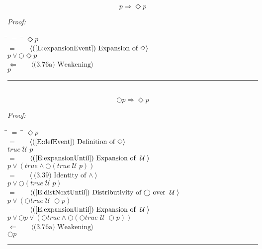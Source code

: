 \documentclass[fleqn, leqno]{article}
\newcommand{\lgap}{2pt}                             %
\newcommand{\mymathindent}{24pt}                      %
\newcommand{\Until}{\;\mathcal{U}\;}
\newcommand{\Next}{\bigcirc}
\newcommand{\Event}{\Diamond}
\newcommand{\myqed}{\hfill\rule[-.23ex]{1.2ex}{2.0ex}}
\newcommand{\Gll} {\langle}                         %
\newcommand{\Ggg} {\rangle}                         %
\newcommand{\Hint}[1]     {\ \ \ $\Gll              \mbox{#1} \Ggg$ }   %
\begin{document}
\begin{equation}\label{E:impEvent}
p \Rightarrow \Event p
\end{equation}

\emph{Proof:}
\begin{tabbing}
\hspace{\mymathindent} \= $= \;$ \= \kill
  \> \>   $\Event p$\\[\lgap]
  \> $=$  \>  \Hint{(\ref{E:expansionEvent}) Expansion of $\Event$}\\[\lgap]
  \> \>   $p \lor \Next\Event p$\\[\lgap]
  \> $\Leftarrow$  \>  \Hint{(3.76a) Weakening}\\[\lgap]
  \> \>   $p$\\[\lgap]
\end{tabbing}
\myqed\\[\lgap]


\begin{equation}\label{E:nextEvent}
\Next p \Rightarrow \Event p
\end{equation}

\emph{Proof:}
\begin{tabbing}
\hspace{\mymathindent} \= $= \;$ \= \kill
  \> \>   $\Event p$\\[\lgap]
  \> $=$  \>  \Hint{(\ref{E:defEvent}) Definition of $\Event$}\\[\lgap]
  \> \>   $true \Until p$\\[\lgap]
  \> $=$  \>  \Hint{(\ref{E:expansionUntil}) Expansion of $\Until$}\\[\lgap]
  \> \>   $p \lor (true \land \Next(true \Until p))$\\[\lgap]
  \> $=$  \>  \Hint{(3.39) Identity of $\land$}\\[\lgap]
  \> \>   $p \lor \Next(true \Until p)$\\[\lgap]
  \> $=$  \>  \Hint{(\ref{E:distNextUntil}) Distributivity of $\Next$ over $\Until$}\\[\lgap]
  \> \>   $p \lor (\Next true \Until \Next p)$\\[\lgap]
  \> $=$  \>  \Hint{(\ref{E:expansionUntil}) Expansion of $\Until$}\\[\lgap]
  \> \>   $p \lor \Next p \lor (\Next true \land \Next(\Next true \Until \Next p))$\\[\lgap]
  \> $\Leftarrow$ \> \Hint{(3.76a) Weakening}\\[\lgap]
  \> \>   $\Next p$\\[\lgap]
\end{tabbing}
\myqed\\[\lgap]
\end{document}
